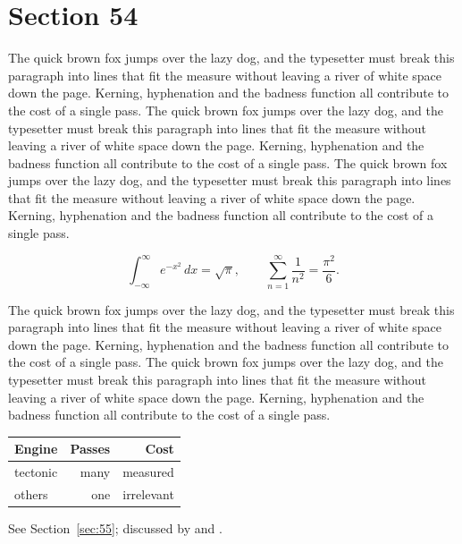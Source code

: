 \documentclass{article}
\begin{document}
\section{Section 54}
\label{sec:54}
The quick brown fox jumps over the lazy dog, and the typesetter must break this paragraph into lines that fit the measure without leaving a river of white space down the page. Kerning, hyphenation and the badness function all contribute to the cost of a single pass. The quick brown fox jumps over the lazy dog, and the typesetter must break this paragraph into lines that fit the measure without leaving a river of white space down the page. Kerning, hyphenation and the badness function all contribute to the cost of a single pass. The quick brown fox jumps over the lazy dog, and the typesetter must break this paragraph into lines that fit the measure without leaving a river of white space down the page. Kerning, hyphenation and the badness function all contribute to the cost of a single pass. 

\begin{equation}\label{eq:54}
\int_{-\infty}^{\infty} e^{-x^{2}}\,dx = \sqrt{\pi}, \qquad
\sum_{n=1}^{\infty} \frac{1}{n^{2}} = \frac{\pi^{2}}{6}.
\end{equation}

The quick brown fox jumps over the lazy dog, and the typesetter must break this paragraph into lines that fit the measure without leaving a river of white space down the page. Kerning, hyphenation and the badness function all contribute to the cost of a single pass. The quick brown fox jumps over the lazy dog, and the typesetter must break this paragraph into lines that fit the measure without leaving a river of white space down the page. Kerning, hyphenation and the badness function all contribute to the cost of a single pass. 

\begin{center}
\begin{tabular}{lrr}
\toprule
Engine & Passes & Cost \\
\midrule
tectonic & many & measured \\
others & one & irrelevant \\
\bottomrule
\end{tabular}
\end{center}

See Section~\ref{sec:55}; discussed by \textcite{k5} and \textcite{l2}.
\end{document}
